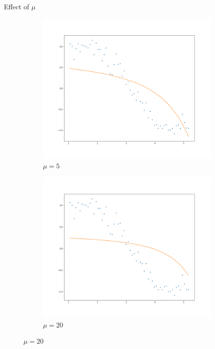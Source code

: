\documentclass{beamer}
\begin{document}
\begin{frame}{Effect of $\mu$}
\begin{figure}
        \begin{subfigure}[b]{0.5\textwidth}
                \includegraphics[width=\linewidth]{ridge/rid_plot_5.png}
                \caption{$\mu = 5$}
        \end{subfigure}%
        \begin{subfigure}[b]{0.5\textwidth}
                \includegraphics[width=\linewidth]{ridge/rid_plot_9.png}
                \caption{$\mu = 20$}
        \end{subfigure}%
\end{figure}
\end{frame}
\end{document}
